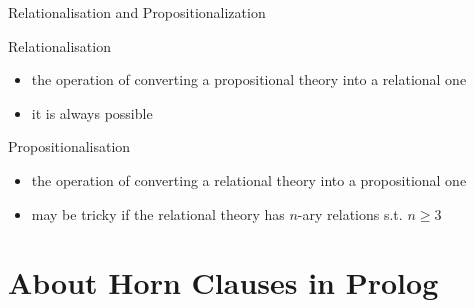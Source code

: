 \documentclass[presentation]{beamer}\mode<presentation>{\usetheme{AMSBolognaFC}}
\begin{document}
\begin{frame}{Relationalisation and Propositionalization}
    \begin{block}{Relationalisation}
        \begin{itemize}
            \item the operation of converting a propositional theory into a relational one
            \item it is always possible
        \end{itemize}
    \end{block}

    \begin{block}{Propositionalisation}
        \begin{itemize}
            \item the operation of converting a relational theory into a propositional one
            \item may be tricky if the relational theory has $n$-ary relations s.t. $n\geq3$
        \end{itemize}
    \end{block}
\end{frame}

\section{About Horn Clauses in Prolog}
\end{document}
